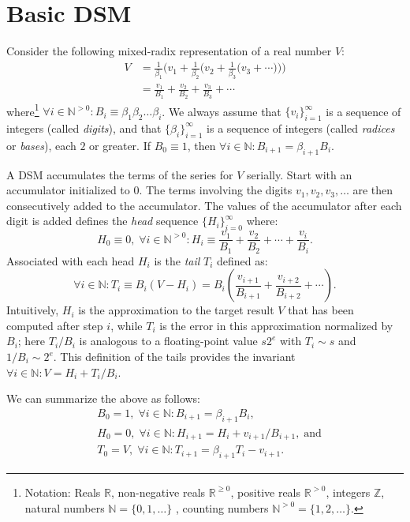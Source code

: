 \documentclass[10pt]{article}
\theoremstyle{definition}
\theoremstyle{remark}
\numberwithin{equation}{section}
\newcommand{\ints}{\mathbb{Z}}
\newcommand{\nats}{\mathbb{N}}
\newcommand{\pnats}{\mathbb{N}^{>0}}
\newcommand{\reals}{\mathbb{R}}
\newcommand{\nnreals}{\mathbb{R}^{\ge0}}
\newcommand{\preals}{\mathbb{R}^{>0}}
\begin{document}
\section{Basic DSM\label{sec:digitserialmethods}}

Consider the following mixed-radix representation of a real number $V$:
\begin{align*}
V &= \frac{1}{\beta_1}\Big( v_1 + \frac{1}{\beta_2}\Big(v_2 + \frac{1}{\beta_3}\Big(v_3 + \cdots\Big)\Big)\Big) \\
&= \frac{v_{1}}{B_{1}} + \frac{v_{2}}{B_{2}} + \frac{v_{3}}{B_{3}} + \cdots 
\end{align*}
where\footnote{Notation: Reals $\reals$, non-negative reals $\nnreals$, positive reals $\preals$, integers $\ints$, natural numbers $\nats = \{0,1,\ldots\}$ , counting numbers $\pnats = \{1,2,\ldots\}$.} $\forall i \in \pnats: B_i \equiv \beta_1 \beta_2 \ldots \beta_i$.
We always assume that $\{v_i\}_{i=1}^{\infty}$ is a sequence of integers (called \emph{digits}), and that $\{\beta_i\}_{i=1}^{\infty}$ is a sequence of integers (called \emph{radices} or \emph{bases}), each $2$ or greater.
If $B_0 \equiv 1$, then $\forall i \in \nats: B_{i+1} = \beta_{i+1} B_i$.

A DSM accumulates the terms of the series for $V$ serially.
Start with an accumulator initialized to $0$. The terms involving the digits $v_1, v_2, v_3, \ldots$ are then consecutively added to the accumulator.
The values of the accumulator after each digit is added defines the \emph{head} sequence $\{H_i\}_{i=0}^\infty$ where:
\[
H_0 \equiv 0,\; \forall i \in \pnats: H_i \equiv \frac{v_1}{B_1} + \frac{v_2}{B_2} + \cdots + \frac{v_i}{B_i} .
\]
Associated with each head $H_i$ is the \emph{tail} $T_i$ defined as:
\[
\forall i \in \nats: T_i \equiv B_i \left(V - H_i\right) = B_i \left(\frac{v_{i+1}}{B_{i+1}} + \frac{v_{i+2}}{B_{i+2}} + \cdots\right) .
\]
Intuitively, $H_i$ is the approximation to the target result $V$ that has been computed after step $i$,
while $T_i$ is the error in this approximation normalized by $B_i$; here $T_i/B_i$ is analogous to a floating-point value $s 2^e$ with $T_i \sim s$ and $1/B_i \sim 2^e$. 
This definition of the tails provides the invariant $\forall i \in \nats : V = H_i + T_i/B_i$.

We can summarize the above as follows:
\begin{align*}
 &B_0 = 1,\; \forall i \in \nats: B_{i+1} = \beta_{i+1} B_i, \\
 &H_0 = 0,\; \forall i \in \nats: H_{i+1} = H_i + v_{i+1}/B_{i+1}, \;\text{and} \\
 &T_0 = V,\; \forall i \in \nats: T_{i+1} = \beta_{i+1} T_i - v_{i+1} .
\end{align*}
\end{document}
